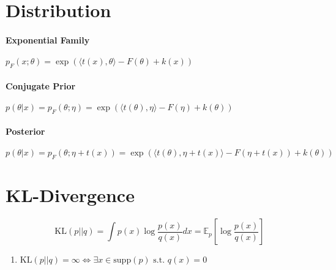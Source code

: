 \section{Distribution}

\paragraph{Exponential Family}
$p_{F}(x; \theta) = \exp(\langle t(x), \theta\rangle - F(\theta) + k(x))$ \\

\paragraph{Conjugate Prior}
$p(\theta | x) = p_{F}(\theta; \eta) = \exp(\langle t(\theta), \eta\rangle - F(\eta) + k(\theta))$ \\

\paragraph{Posterior}
$p(\theta | x) = p_{F}(\theta; \eta + t(x)) = \exp(\langle t(\theta), \eta + t(x)\rangle - F(\eta + t(x)) + k(\theta))$ \\


\section{KL-Divergence}
\begin{equation}
    \text{KL}(p || q) = \int p(x) \log \frac{p(x)}{q(x)} dx = \mathbb{E}_p \left[ \log \frac{p(x)}{q(x)} \right]
\end{equation}
\begin{enumerate}
    \item $ \text{KL}(p || q) = \infty \iff \exists x \in \text{supp}(p) \text{ s.t. } q(x) = 0$
\end{enumerate}


